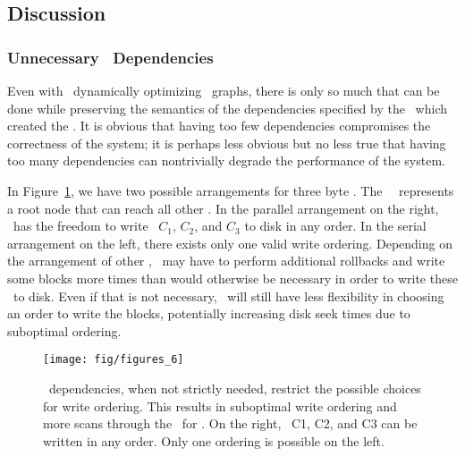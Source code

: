 


\subsection{Discussion}
\label{sec:chdescs:discussion}

\subsubsection{Unnecessary \ChDesc\ Dependencies}
Even with \Kudos\ dynamically optimizing \chdesc\ graphs, there is only so much
that can be done while preserving the semantics of the dependencies specified by
the \module\ which created the \chdescs. It is obvious that having too few
dependencies compromises the correctness of the system; it is perhaps less
obvious but no less true that having too many dependencies can nontrivially
degrade the performance of the system.

In Figure~\ref{fig:chdescarrange}, we have two possible arrangements for three
byte \chdescs. The \noop\ \chdesc\ represents a root node that can reach all
other \chdescs. In the parallel arrangement on the right, \Kudos\ has the
freedom to write \chdescs\ $C_1$, $C_2$, and $C_3$ to disk in any order. In the
serial arrangement on the left, there exists only one valid write ordering.
Depending on the arrangement of other \chdescs, \Kudos\ may have to perform
additional rollbacks and write some blocks more times than would otherwise be
necessary in order to write these \chdescs\ to disk. Even if that is not
necessary, \Kudos\ will still have less flexibility in choosing an order to
write the blocks, potentially increasing disk seek times due to suboptimal
ordering.

\begin{figure}[htb]
  \centering
  \texttt{[image: fig/figures\_6]}
  \caption{\label{fig:chdescarrange} \Chdesc\ dependencies, when
  not strictly needed, restrict the possible choices for write ordering.
  This results in suboptimal write ordering and more scans through the
  \chdescs\ for \Kudos. On the right, \chdescs\ C1, C2, and C3 can be written
  in any order. Only one ordering is possible on the left.}
\end{figure}


